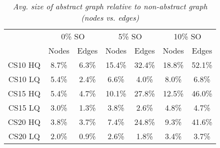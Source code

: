 \begin{table}[ht]
\begin{center}
\caption{\small{\emph{Avg. size of abstract graph relative to non-abstract graph (nodes vs. edges)}}}
\label{aha-table:graphsize}
\begin{tabular*}{0.49\textwidth}{@{\extracolsep{\fill}}ccccccc}%
  \hline
 & \multicolumn{2}{c}{\small{0\% SO}} & \multicolumn{2}{c}{\small{5\% SO}} & \multicolumn{2}{c}{\small{10\% SO}} \\
 & \small{Nodes} & \small{Edges} & \small{Nodes} & \small{Edges} & \small{Nodes} & \small{Edges} \\
  \hline
  \small{CS10 HQ} & \small{8.7\%} & \small{6.3\%} & \small{15.4\%} & \small{32.4\%} & \small{18.8\%} & \small{52.1\%} \\
  \small{CS10 LQ} & \small{5.4\%} & \small{2.4\%} & \small{6.6\%}  & \small{4.0\%}  & \small{8.0\%}  & \small{6.8\%} \\
  \small{CS15 HQ} & \small{5.4\%} & \small{4.7\%} & \small{10.1\%}  & \small{27.8\%} & \small{12.5\%}  & \small{46.0\%} \\
  \small{CS15 LQ} & \small{3.0\%} & \small{1.3\%} & \small{3.8\%}  & \small{2.6\%}  & \small{4.8\%}  & \small{4.7\%} \\
  \small{CS20 HQ} & \small{3.8\%} & \small{3.7\%} & \small{7.4\%}  & \small{24.8\%} & \small{9.3\%}  & \small{41.6\%} \\
  \small{CS20 LQ} & \small{2.0\%} & \small{0.9\%} & \small{2.6\%}  & \small{1.8\%}  & \small{3.4\%}  & \small{3.7\%} \\
   \hline
\end{tabular*}
\end{center}
\end{table}

